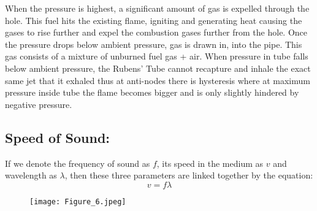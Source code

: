 \documentclass[12pt,a4paper]{article}
\begin{document}
\begin{figure}[!ht]
	\begin{center}
	\end{center}
\end{figure}
\clearpage
\noindent
When the pressure is highest, a significant amount of gas is expelled through the hole. This fuel hits the existing flame, igniting and generating heat causing the gases to rise further and expel the combustion gases further from the hole. Once the pressure drops below ambient pressure, gas is drawn in, into the pipe. This gas consists of a mixture of unburned fuel gas + air. When pressure in tube falls below ambient pressure, the Rubens’ Tube cannot recapture and inhale the exact same jet that it exhaled thus at anti-nodes there is hysteresis where at
maximum pressure inside tube the flame becomes bigger and is only slightly hindered by negative pressure.
\subsection{Speed of Sound:}
If we denote the frequency of sound as $f$, its speed in the medium as $v$ and wavelength as $\lambda$, then these three parameters are linked together by the equation:\\
\begin{equation}
    \text{$v$} = \text{$f$} \text{$\lambda$}
\end{equation}
\begin{figure}[!ht]
	\begin{center}
		\texttt{[image: Figure\_6.jpeg]}
	\end{center}
\end{figure}
\end{document}
